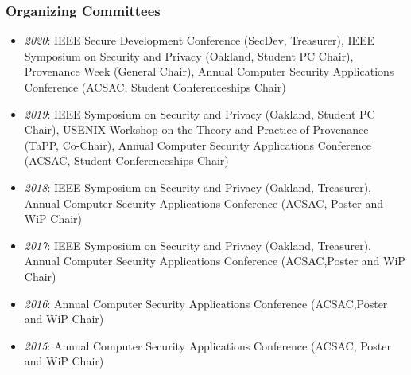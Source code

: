 \hypertarget{organizing-committees}{%
\subsubsection{Organizing Committees}\label{organizing-committees}}
\begin{itemize}
\tightlist
\item
  \emph{2020}: IEEE Secure Development Conference (SecDev, Treasurer),
  IEEE Symposium on Security and Privacy (Oakland, Student PC Chair),
  Provenance Week (General Chair), Annual Computer Security Applications Conference (ACSAC, Student Conferenceships Chair)
\item
  \emph{2019}: IEEE Symposium on Security and Privacy (Oakland, Student PC Chair),
  USENIX Workshop on the Theory and Practice of Provenance (TaPP, Co-Chair),
  Annual Computer Security Applications Conference (ACSAC, Student Conferenceships Chair)
\item
  \emph{2018}: IEEE Symposium on Security and Privacy (Oakland, Treasurer),
  Annual Computer Security Applications Conference (ACSAC, Poster and WiP Chair)
\item
  \emph{2017}: IEEE Symposium on Security and Privacy (Oakland, Treasurer),
  Annual Computer Security Applications Conference (ACSAC,Poster and WiP Chair)
\item
  \emph{2016}: Annual Computer Security Applications Conference (ACSAC,Poster and WiP Chair)
\item
  \emph{2015}: Annual Computer Security Applications Conference (ACSAC, Poster and WiP Chair)
\end{itemize}

